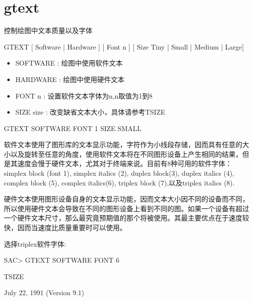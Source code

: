 \section{gtext}
\label{cmd:gtext}

控制绘图中文本质量以及字体

GTEXT [ Software | Hardware ] [ Font n ] [ Size Tiny | Small | Medium | Large]

\begin{itemize}
\item SOFTWARE :  绘图中使用软件文本
\item HARDWARE :  绘图中使用硬件文本 
\item FONT n :  设置软件文本字体为n,n取值为1到8 
\item SIZE size :  改变缺省文本大小，具体请参考TSIZE 
\end{itemize}

GTEXT SOFTWARE FONT 1 SIZE SMALL

软件文本使用了图形库的文本显示功能，字符作为小线段存储，因而具有任意的大小以及旋转至任意的角度，使用软件文本将在不同图形设备上产生相同的结果，但是其速度会慢于硬件文本，尤其对于终端来说。目前有8种可用的软件字体：simplex block (font 1), simplex italics (2), duplex block(3), duplex italics (4), complex block (5), complex italics(6), triplex block (7),以及triplex italics (8).  

硬件文本使用图形设备自身的文本显示功能，因而文本大小因不同的设备而不同，所以使用硬件文本会导致在不同的图形设备上看到不同的图。如果一个设备有超过一个硬件文本尺寸，那么最究竟预期值的那个将被使用。其最主要优点在于速度较快，因而当速度比质量重要时可以使用。

选择triplex软件字体:
\begin{SACCode}
SAC> GTEXT SOFTWARE FONT 6
\end{SACCode}

TSIZE

July 22, 1991 (Version 9.1)
